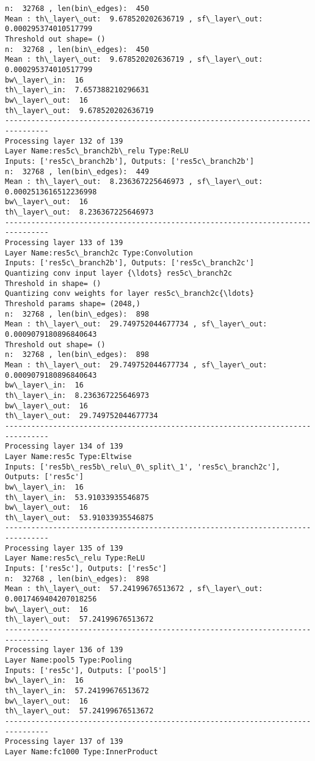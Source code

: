\documentclass[11pt]{article}
\begin{document}
\begin{Verbatim}[commandchars=\\\{\}]
n:  32768 , len(bin\_edges):  450
Mean : th\_layer\_out:  9.678520202636719 , sf\_layer\_out:  0.000295374010517799
Threshold out shape= ()
n:  32768 , len(bin\_edges):  450
Mean : th\_layer\_out:  9.678520202636719 , sf\_layer\_out:  0.000295374010517799
bw\_layer\_in:  16
th\_layer\_in:  7.657388210296631
bw\_layer\_out:  16
th\_layer\_out:  9.678520202636719
--------------------------------------------------------------------------------
Processing layer 132 of 139
Layer Name:res5c\_branch2b\_relu Type:ReLU
Inputs: ['res5c\_branch2b'], Outputs: ['res5c\_branch2b']
n:  32768 , len(bin\_edges):  449
Mean : th\_layer\_out:  8.236367225646973 , sf\_layer\_out:  0.0002513616512236998
bw\_layer\_out:  16
th\_layer\_out:  8.236367225646973
--------------------------------------------------------------------------------
Processing layer 133 of 139
Layer Name:res5c\_branch2c Type:Convolution
Inputs: ['res5c\_branch2b'], Outputs: ['res5c\_branch2c']
Quantizing conv input layer {\ldots} res5c\_branch2c
Threshold in shape= ()
Quantizing conv weights for layer res5c\_branch2c{\ldots}
Threshold params shape= (2048,)
n:  32768 , len(bin\_edges):  898
Mean : th\_layer\_out:  29.749752044677734 , sf\_layer\_out:  0.0009079180896840643
Threshold out shape= ()
n:  32768 , len(bin\_edges):  898
Mean : th\_layer\_out:  29.749752044677734 , sf\_layer\_out:  0.0009079180896840643
bw\_layer\_in:  16
th\_layer\_in:  8.236367225646973
bw\_layer\_out:  16
th\_layer\_out:  29.749752044677734
--------------------------------------------------------------------------------
Processing layer 134 of 139
Layer Name:res5c Type:Eltwise
Inputs: ['res5b\_res5b\_relu\_0\_split\_1', 'res5c\_branch2c'], Outputs: ['res5c']
bw\_layer\_in:  16
th\_layer\_in:  53.91033935546875
bw\_layer\_out:  16
th\_layer\_out:  53.91033935546875
--------------------------------------------------------------------------------
Processing layer 135 of 139
Layer Name:res5c\_relu Type:ReLU
Inputs: ['res5c'], Outputs: ['res5c']
n:  32768 , len(bin\_edges):  898
Mean : th\_layer\_out:  57.24199676513672 , sf\_layer\_out:  0.0017469404207018256
bw\_layer\_out:  16
th\_layer\_out:  57.24199676513672
--------------------------------------------------------------------------------
Processing layer 136 of 139
Layer Name:pool5 Type:Pooling
Inputs: ['res5c'], Outputs: ['pool5']
bw\_layer\_in:  16
th\_layer\_in:  57.24199676513672
bw\_layer\_out:  16
th\_layer\_out:  57.24199676513672
--------------------------------------------------------------------------------
Processing layer 137 of 139
Layer Name:fc1000 Type:InnerProduct

\end{Verbatim}
\end{document}

